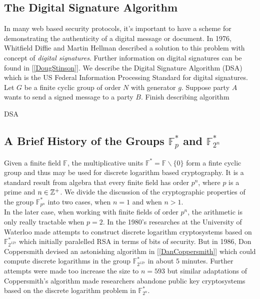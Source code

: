 \subsection{The Digital Signature Algorithm}

In many web based security protocols, it's important to have a scheme for demonstrating the authenticity of a digital message or document. In 1976, Whitfield Diffie and Martin Hellman described a solution to this problem with concept of \textit{digital signatures}. Further information on digital signatures can be found in [\ref{DougStinson}]. We describe the Digital Signature Algorithm (DSA) which is the US Federal Information Processing Standard for digital signatures. \\ 

Let $G$ be a finite cyclic group of order $N$ with generator $g$. Suppose party $A$ wants to send a signed message to a party $B$. {\color{blue}  Finish describing algorithm}


\begin{algorithm} 
	\caption{DSA }
	\begin{algorithmic}[1]
		\State 
	\end{algorithmic} 
\end{algorithm} 


\subsection{A Brief History of the Groups $\mathbb{F}_p^*$ and $\mathbb{F}_{2^n}^*$}

Given a finite field $\mathbb{F}$, the multiplicative units $\mathbb{F}^* = \mathbb{F} \backslash \lbrace 0 \rbrace $ form a finte cyclic group and thus may be used for discrete logarithm based cryptography. It is a standard result from algebra that every finite field has order $p^n$, where $p$ is a prime and $n \in \mathbb{Z}^+$. We divide the discussion of the cryptographic properties of the group $\mathbb{F}_{p^n}^*$ into two cases, when $n = 1$ and when $n>1$. \\

In the later case, when working with finite fields of order $p^n$, the arithmetic is only really tractable when $p=2$. In the 1980's researches at the University of Waterloo made attempts to construct discrete logarithm cryptosystems based on $\mathbb{F}_{2^{127}}^*$ which initially paralelled RSA in terms of bits of security. But in 1986, Don Coppersmith devised an astonishing algorithm in [\ref{DanCoppersmith}] which could compute discrete logarithms in the group $\mathbb{F}_{2^{127}}^*$ in about $5$ minutes. Further attempts were made too increase the size to $n=593$ but similar adaptations of Coppersmith's algorithm made researchers abandone public key cryptosystems based on the discrete logarithm problem in $\mathbb{F}_{2^n}^*$. \\

